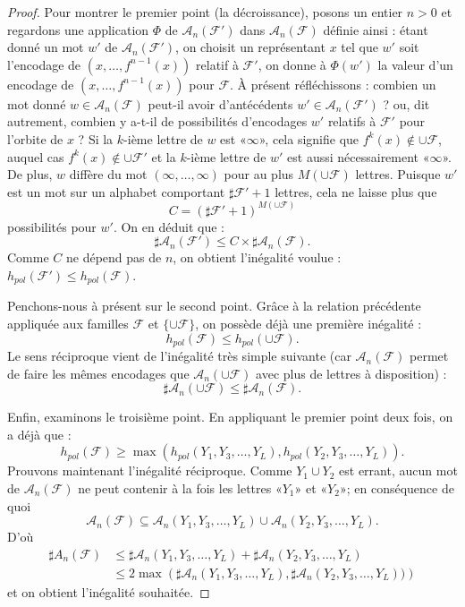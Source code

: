 \documentclass[11pt]{article}
\providecommand{\og}{«\nobreakspace}
\providecommand{\fg}{\nobreakspace»}
\theoremstyle{definition}
\numberwithin{equation}{section}
\numberwithin{figure}{section}
\numberwithin{table}{section}
\newcommand*\cA{{\mathcal A}}
\newcommand*\cF{{\mathcal F}}
\begin{document}
\begin{proof}
Pour montrer le premier point (la {décroissance}), posons un entier $n > 0$ et regardons une application $\Phi$ de $\cA_n(\cF')$ dans $\cA_n(\cF)$ définie ainsi : étant donné un mot $w'$ de $\cA_n(\cF')$, on choisit un représentant $x$ tel que $w'$ soit l'encodage de $(x, \dots, f^{n-1}(x))$ relatif à $\cF'$, on donne à $\Phi(w')$ la valeur d'un encodage de $(x, \dots, f^{n-1}(x))$ pour $\cF$. \`A présent réfléchissons : combien un mot {donné} $w \in \cA_n(\cF)$ peut-il avoir d'antécédents {$w' \in \cA_n(\cF')$} ? ou, dit autrement, combien y a-t-il de possibilités d'encodages $w'$ relatifs à $\cF'$ pour l'orbite de $x$ ? Si la $k$-ième lettre de $w$ est \og$\infty$\fg, cela signifie que $f^k(x) \not \in \cup \cF$, auquel cas $f^k(x) \not \in \cup \cF'$ et la $k$-ième lettre de $w'$ est aussi nécessairement \og$\infty$\fg. De plus, $w$ diffère du mot $(\infty, \dots, \infty)$ pour au plus $M(\cup \cF)$ lettres. Puisque $w'$ est un mot sur un alphabet comportant $\sharp \cF'+1$ lettres, cela ne laisse plus que
\[
C = \left(\sharp \cF'+1 \right)^{M(\cup \cF)}
\]
possibilités pour $w'$. On en déduit que :
\[
\sharp \cA_n(\cF') \leq C \times \sharp \cA_n(\cF).
\]
Comme $C$ ne dépend pas de $n$, on obtient l'inégalité voulue : $h_{pol}(\cF') \leq h_{pol}(\cF)$.


Penchons-nous à présent sur le second point. Grâce à la relation précédente appliquée aux familles $\cF$ et $\{\cup \cF\}$, on possède déjà une première inégalité :
\[
h_{pol}(\cF) \leq h_{pol}(\cup \cF).
\]
Le sens réciproque vient de l'inégalité très simple suivante (car $\cA_n(\cF)$ permet de faire les mêmes encodages que $\cA_n(\cup \cF)$ avec plus de lettres à disposition) :
\[
\sharp \cA_n(\cup \cF) \leq \sharp \cA_n(\cF).
\]


Enfin, examinons le troisième point. En appliquant le premier point deux fois, on a déjà que :
\[
h_{pol}(\cF) \geq \max(h_{pol}(Y_{1},Y_3, \dots, Y_{L}), h_{pol}(Y_{2},Y_3, \dots, Y_{L})).
\]
Prouvons maintenant l'inégalité réciproque. Comme $Y_1\cup Y_2$ est errant, aucun mot de $\cA_n(\cF)$ ne peut contenir à la fois les lettres \og$Y_1$\fg{} et \og$Y_2$\fg; en conséquence de quoi
\[
\cA_n(\cF) \subseteq \cA_n(Y_1, Y_3, \dots, Y_L) \cup \cA_n(Y_2, Y_3, \dots, Y_L).
\]
D'où
\begin{align*}
\sharp A_{n}(\cF) & \leq \sharp \cA_n(Y_1, Y_3, \dots, Y_L) +\sharp \cA_n(Y_2, Y_3, \dots, Y_L) \\
& \leq 2 \max \left(\sharp \cA_n(Y_1, Y_3, \dots, Y_L), \sharp \cA_n(Y_2, Y_3, \dots, Y_L))\right)
\end{align*}
et on obtient l'inégalité souhaitée.
\end{proof}
\end{document}
